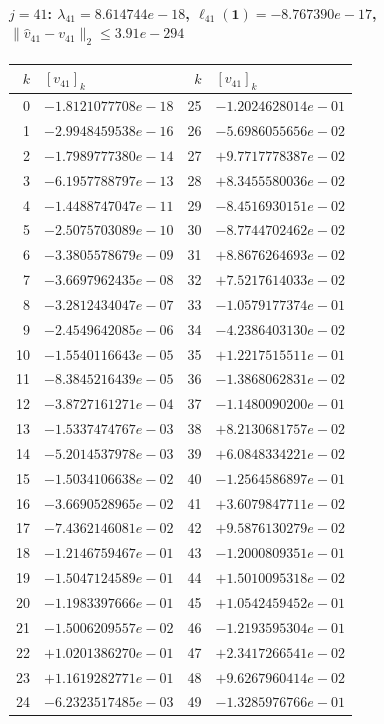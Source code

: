 \paragraph{$j = 41$: $\lambda_{41} = 8.614744e-18$, \quad $\ell_{41}(\mathbf{1}) = -8.767390e-17$, \quad $\|\hat{v}_{41} - v_{41}\|_2 \leq 3.91e-294$}
\begin{center}
{\footnotesize
\begin{tabular}{r@{\;\;}l@{\quad}r@{\;\;}l}
\toprule
$k$ & $[v_{41}]_k$ & $k$ & $[v_{41}]_k$ \\
\midrule
0 & $-1.8121077708e-18$ & 25 & $-1.2024628014e-01$ \\
1 & $-2.9948459538e-16$ & 26 & $-5.6986055656e-02$ \\
2 & $-1.7989777380e-14$ & 27 & $+9.7717778387e-02$ \\
3 & $-6.1957788797e-13$ & 28 & $+8.3455580036e-02$ \\
4 & $-1.4488747047e-11$ & 29 & $-8.4516930151e-02$ \\
5 & $-2.5075703089e-10$ & 30 & $-8.7744702462e-02$ \\
6 & $-3.3805578679e-09$ & 31 & $+8.8676264693e-02$ \\
7 & $-3.6697962435e-08$ & 32 & $+7.5217614033e-02$ \\
8 & $-3.2812434047e-07$ & 33 & $-1.0579177374e-01$ \\
9 & $-2.4549642085e-06$ & 34 & $-4.2386403130e-02$ \\
10 & $-1.5540116643e-05$ & 35 & $+1.2217515511e-01$ \\
11 & $-8.3845216439e-05$ & 36 & $-1.3868062831e-02$ \\
12 & $-3.8727161271e-04$ & 37 & $-1.1480090200e-01$ \\
13 & $-1.5337474767e-03$ & 38 & $+8.2130681757e-02$ \\
14 & $-5.2014537978e-03$ & 39 & $+6.0848334221e-02$ \\
15 & $-1.5034106638e-02$ & 40 & $-1.2564586897e-01$ \\
16 & $-3.6690528965e-02$ & 41 & $+3.6079847711e-02$ \\
17 & $-7.4362146081e-02$ & 42 & $+9.5876130279e-02$ \\
18 & $-1.2146759467e-01$ & 43 & $-1.2000809351e-01$ \\
19 & $-1.5047124589e-01$ & 44 & $+1.5010095318e-02$ \\
20 & $-1.1983397666e-01$ & 45 & $+1.0542459452e-01$ \\
21 & $-1.5006209557e-02$ & 46 & $-1.2193595304e-01$ \\
22 & $+1.0201386270e-01$ & 47 & $+2.3417266541e-02$ \\
23 & $+1.1619282771e-01$ & 48 & $+9.6267960414e-02$ \\
24 & $-6.2323517485e-03$ & 49 & $-1.3285976766e-01$ \\
\bottomrule
\end{tabular}
}
\end{center}


